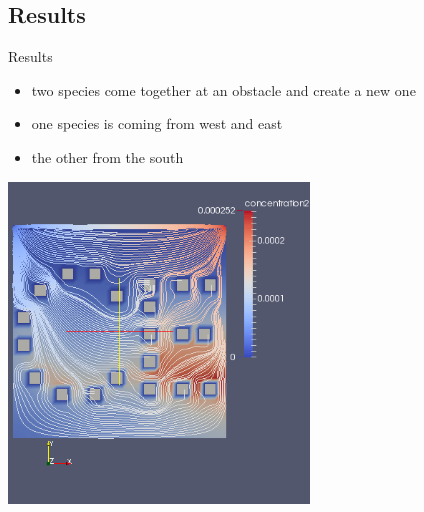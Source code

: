 \documentclass[t,mathserif]{beamer}
\begin{document}
\subsection{Results}
\begin{frame}[allowframebreaks]{Results}
\begin{itemize}
	\item two species come together at an obstacle and create a new one
	\item one species is coming from west and east
	\item the other from the south
\end{itemize}
\framebreak
\begin{center}
\includegraphics[width=0.6\textwidth]{result1.png}
\end{center}
\end{frame}
\end{document}
